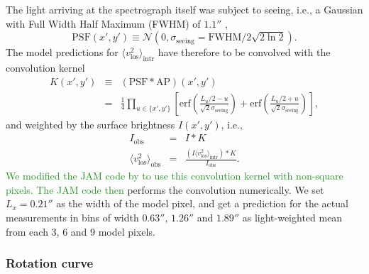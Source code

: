 \documentclass[useAMS,usenatbib]{mnras}
\newcommand{\NEW}[1]{\textcolor{ForestGreen}{#1}}
\newcommand{\OLD}[1]{}
\begin{document}
The light arriving at the spectrograph itself was subject to seeing, i.e., a Gaussian with Full Width Half Maximum (FWHM) of $1.1''$ \citep{SWELLSV},
\begin{equation*}
\text{PSF}(x',y')\equiv\mathscr{N}(0,\sigma_\text{seeing}=\text{FWHM}/2\sqrt{2\ln2}).
\end{equation*}
The model predictions for $\langle v_\text{los}^2 \rangle_\text{intr}$ have therefore to be convolved with the convolution kernel
\begin{eqnarray*}
K(x',y') &\equiv& (\text{PSF} \ast \text{AP})(x',y') \\
&=& \frac{1}{4} \prod_{u \in \{x',y'\}} \left[ \text{erf}\left( \frac{L_u/2 - u}{\sqrt{2}\sigma_\text{seeing}}\right) + \text{erf} \left( \frac{L_u/2 + u}{\sqrt{2} \sigma_\text{seeing}} \right) \right],
\end{eqnarray*}
and weighted by the surface brightness $I(x',y')$, i.e.,
\begin{eqnarray*}
I_\text{obs} &=& I \ast K\\
\langle v_\text{los}^2 \rangle_\text{obs} &=& \frac{(I \langle v_\text{los}^2\rangle_\text{intr}) \ast K}{I_\text{obs}}.
\end{eqnarray*}
\NEW{We modified the JAM code by \citet{Cap08} to use this convolution kernel with non-square pixels. The JAM code then}\OLD{If provided with the convolution kernel, the JAM code\footnote{The IDL code package for Jeans Anisotropic Models (JAM) by \citet{Cap08} is available online at \url{http://www-astro.physics.ox.ac.uk/~mxc/software}. The version from June 2012 was used in this work.} by \citet{Cap08}} performs the convolution numerically. We set $L_x = 0.21''$ as the width of the model pixel, and get a prediction for the actual measurements in bins of width $0.63''$, $1.26''$ and $1.89''$ \citep{SWELLSV} as light-weighted mean from each 3, 6 and 9 model pixels.

\subsubsection{Rotation curve} \label{sec:model_JAM_rotation}
\end{document}
